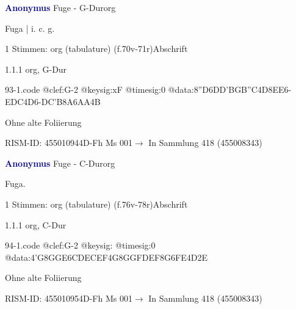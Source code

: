 \documentclass[twocolumn, 12pt]{book}
\begin{document}
\par \vspace{16pt} \textcolor{darkblue}{\textbf{Anonymus  }}\hfillplus{\textbf{[93]}}\newline Fuge - G-Dur\newline org
\par \begin{itshape}[f.70v, at left:] Fuga | i. c. g.\end{itshape} 
\par \textcolor{darkblue}{}  1 Stimmen: org (tabulature)  (f.70v-71r)\newline Abschrift
\par 1.1.1  org, G-Dur  
\begin{filecontents*}{93-1.code}
@clef:G-2
@keysig:xF
@timesig:0
@data:{8''D6DD}{'BGB''C}4D{8EE}6-{EDC}4D6-{DC'B}{8A6AA}4B
\end{filecontents*}
\newline %
\par Ohne alte Foliierung
\par RISM-ID: 455010944\newline D-Fh  Ms 001\newline $\rightarrow$ In Sammlung 418 (455008343)
      
\par \vspace{16pt} \textcolor{darkblue}{\textbf{Anonymus  }}\hfillplus{\textbf{[94]}}\newline Fuge - C-Dur\newline org
\par \begin{itshape}[f.76v, at left:] Fuga.\end{itshape} 
\par \textcolor{darkblue}{}  1 Stimmen: org (tabulature)  (f.76v-78r)\newline Abschrift
\par 1.1.1  org, C-Dur  
\begin{filecontents*}{94-1.code}
@clef:G-2
@keysig:
@timesig:0
@data:4'G{8GG}{E6CD}{ECEF}4G{8GG}{FDEF}{8G6FE}4D2E
\end{filecontents*}
\newline %
\par Ohne alte Foliierung
\par RISM-ID: 455010954\newline D-Fh  Ms 001\newline $\rightarrow$ In Sammlung 418 (455008343)
      
\end{document}
